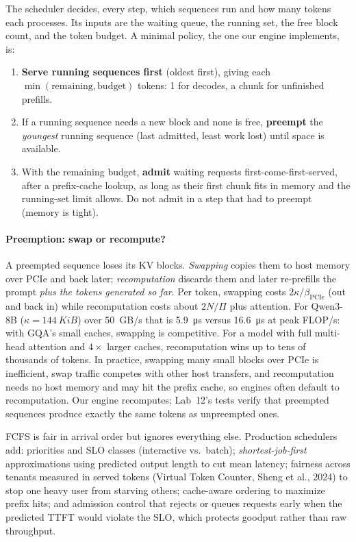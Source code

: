 The scheduler decides, every step, which sequences run and how many tokens each processes. Its inputs
are the waiting queue, the running set, the free block count, and the token budget. A minimal policy,
the one our engine implements, is:
\begin{enumerate}
  \item \textbf{Serve running sequences first} (oldest first), giving each $\min(\text{remaining},
    \text{budget})$ tokens: 1 for decodes, a chunk for unfinished prefills.
  \item If a running sequence needs a new block and none is free, \textbf{preempt} the \emph{youngest}
    running sequence (last admitted, least work lost) until space is available.
  \item With the remaining budget, \textbf{admit} waiting requests first-come-first-served, after a
    prefix-cache lookup, as long as their first chunk fits in memory and the running-set limit allows.
    Do not admit in a step that had to preempt (memory is tight).
\end{enumerate}

\paragraph{Preemption: swap or recompute?} A preempted sequence loses its KV blocks. \emph{Swapping}
copies them to host memory over PCIe and back later; \emph{recomputation} discards them and later
re-prefills the prompt \emph{plus the tokens generated so far}. Per token, swapping costs
$2\kappa/\beta_{\text{PCIe}}$ (out and back in) while recomputation costs about $2N/\Pi$ plus attention.
For Qwen3-8B ($\kappa=\SI{144}{KiB}$) over \SI{50}{GB/s} that is \SI{5.9}{\micro s} versus
\SI{16.6}{\micro s} at peak FLOP/s: with GQA's small caches, swapping is competitive. For a model with
full multi-head attention and $4\times$ larger caches, recomputation wins up to tens of thousands of
tokens. In practice, swapping many small blocks over PCIe is inefficient, swap traffic competes with
other host transfers, and recomputation needs no host memory and may hit the prefix cache, so engines
often default to recomputation. Our engine recomputes; Lab~12's tests verify that preempted sequences produce exactly the
same tokens as unpreempted ones.

\begin{systemslens}
FCFS is fair in arrival order but ignores everything else. Production schedulers add: priorities and
SLO classes (interactive vs.\ batch); \emph{shortest-job-first} approximations using predicted output
length to cut mean latency; fairness across tenants measured in served tokens (Virtual Token Counter,
Sheng et al., 2024) to stop one heavy user from starving others; cache-aware ordering to maximize
prefix hits; and admission control that rejects or queues requests early when the predicted TTFT would
violate the SLO, which protects goodput rather than raw throughput.
\end{systemslens}

